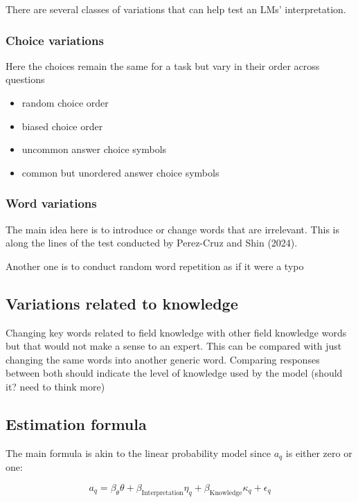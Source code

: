 \documentclass[
]{article}
\begin{document}
There are several classes of variations that can help test an LMs'
interpretation.

\subsubsection{Choice variations}\label{choice-variations}

Here the choices remain the same for a task but vary in their order
across questions

\begin{itemize}
\item
  random choice order
\item
  biased choice order
\item
  uncommon answer choice symbols
\item
  common but unordered answer choice symbols
\end{itemize}

\subsubsection{Word variations}\label{word-variations}

The main idea here is to introduce or change words that are irrelevant.
This is along the lines of the test conducted by Perez-Cruz and Shin
(2024).

Another one is to conduct random word repetition as if it were a typo

\subsection{Variations related to
knowledge}\label{variations-related-to-knowledge}

Changing key words related to field knowledge with other field knowledge
words but that would not make a sense to an expert. This can be compared
with just changing the same words into another generic word. Comparing
responses between both should indicate the level of knowledge used by
the model (should it? need to think more)

\subsection{Estimation formula}\label{estimation-formula}

The main formula is akin to the linear probability model since \(a_{q}\)
is either zero or one:

\[
a_{q} = \beta_{\theta} \theta + \beta_{\text{Interpretation}} \eta_q + \beta_{\text{Knowledge}} \kappa_q + \epsilon_q
\]
\end{document}
